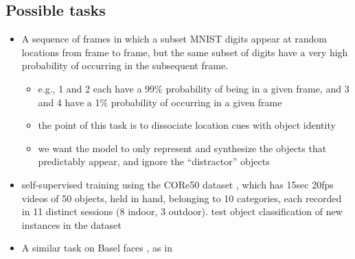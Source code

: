 \documentclass{article}
\begin{document}
\subsection*{Possible tasks}
\begin{itemize}
  \item A sequence of frames in which a subset MNIST digits appear at random locations from frame to frame, but the same subset of digits have a very high probability of occurring in the subsequent frame.
  \begin{itemize}
    \item e.g., 1 and 2 each have a 99\% probability of being in a given frame, and 3 and 4 have a 1\% probability of occurring in a given frame
    \item the point of this task is to dissociate location cues with object identity
    \item we want the model to only represent and synthesize the objects that predictably appear, and ignore the ``distractor'' objects
  \end{itemize}
  \item self-supervised training using the CORe50 dataset \cite{Lomonaco2017}, which has 15sec 20fps videos of 50 objects, held in hand, belonging to 10 categories, each recorded in 11 distinct sessions (8 indoor, 3 outdoor). test object classification of new instances in the dataset
  \item A similar task on Basel faces \cite{Paysan2009}, as in \cite{Kulkarni2015,Whitney2016}
\end{itemize}



\end{document}
